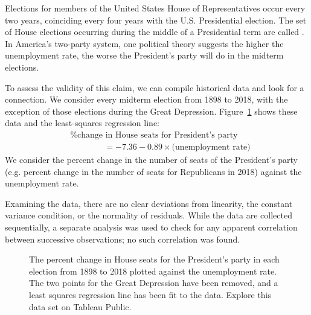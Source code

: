 
Elections for members of the United States House of Representatives occur every two years, coinciding every four years with the U.S. Presidential election. The set of House elections occurring during the middle of a Presidential term are called . In America's two-party system, one political theory suggests the higher the unemployment rate, the worse the President's party will do in the midterm elections.

To assess the validity of this claim, we can compile historical data and look for a connection. We consider every midterm election from 1898 to 2018, with the exception of those elections during the Great Depression. Figure~\ref{unemploymentAndChangeInHouse} shows these data and the least-squares regression line: \vspace{-2mm}
\begin{align*}
&\text{\% change in House seats for President's party}  \\
&\qquad\qquad= -7.36 - 0.89\times \text{(unemployment rate)}
\end{align*}
We consider the percent change in the number of seats of the President's party (e.g. percent change in the number of seats for Republicans in 2018) against the unemployment rate.

Examining the data, there are no clear deviations from linearity, the constant variance condition, or the normality of residuals. While the data are collected sequentially, a separate analysis was used to check for any apparent correlation between successive observations; no such correlation was found.

\begin{figure}[h]
\centering
{}
\caption{The percent change in House seats for the President's party in each election from 1898 to 2018 plotted against the unemployment rate. The two points for the Great Depression have been removed, and a least squares regression line has been fit to the data.  Explore this data set on Tableau Public.}
\label{unemploymentAndChangeInHouse}
\end{figure}

